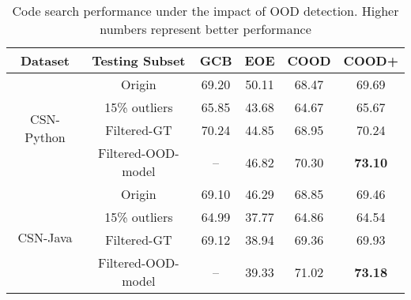 \begin{table}[!tb]
\centering
\caption{Code search performance under the impact of OOD detection. Higher numbers represent better performance}
\label{tab:maintask}
\begin{adjustbox}{width=0.48\textwidth}\small
\begin{tabular}{c|c|c|c|c|c}
\toprule
\textbf{Dataset}            & \textbf{Testing Subset} & \textbf{GCB} & \textbf{EOE} & \textbf{COOD} & \textbf{COOD+} \\ \hline
\multirow{4}{*}{CSN-Python} & Origin                  & 69.20        & 50.11        & 68.47         & 69.69          \\
                            & 15\% outliers            & 65.85        & 43.68        & 64.67         & 65.67          \\
                            & Filtered-GT  & 70.24        & 44.85        & 68.95         & 70.24          \\
                            & Filtered-OOD-model     & --           & 46.82        & 70.30         & \textbf{73.10} \\ \hline
\multirow{4}{*}{CSN-Java}   & Origin                  & 69.10        & 46.29        & 68.85         & 69.46          \\
                            & 15\% outliers            & 64.99        & 37.77        & 64.86         & 64.54          \\
                            & Filtered-GT  & 69.12        & 38.94        & 69.36         & 69.93          \\
                            & Filtered-OOD-model     & --           & 39.33        & 71.02         & \textbf{73.18} \\ \bottomrule
\end{tabular}
\end{adjustbox}
\end{table}